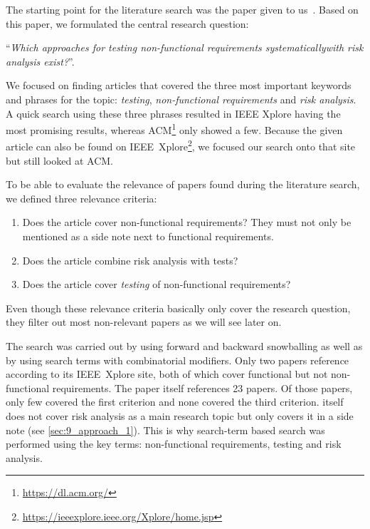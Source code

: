 The starting point for the literature search was the paper given to us~\cite{ZouPavlovski2008}.
Based on this paper, we formulated the central research question: 

\hspace*{0.5cm}\enquote{\textit{Which approaches for testing non-functional requirements systematically\newline \hspace*{0.7cm}with risk analysis exist?}}.

We focused on finding articles that covered the three most important keywords and phrases for the topic: \textit{testing}, \textit{non-functional requirements} and \textit{risk analysis}.
A quick search using these three phrases resulted in IEEE Xplore having the most promising results, whereas ACM\footnote{\url{https://dl.acm.org/}} only showed a few.
Because the given article \cite{ZouPavlovski2008} can also be found on IEEE~Xplore\footnote{\url{https://ieeexplore.ieee.org/Xplore/home.jsp}}, we focused our search onto that site but still looked at ACM.

To be able to evaluate the relevance of papers found during the literature search, we defined three relevance criteria:

\begin{enumerate}
	\item Does the article cover non-functional requirements? They must not only  be mentioned as a side note next to functional requirements.
	\item Does the article combine risk analysis with tests?
	\item Does the article cover \textit{testing} of non-functional requirements?
\end{enumerate}

Even though these relevance criteria basically only cover the research question, they filter out most non-relevant papers as we will see later on.

The search was carried out by using forward and backward snowballing as well as by using search terms with combinatorial modifiers.
Only two papers reference \cite{ZouPavlovski2008} according to its IEEE~Xplore site, both of which cover functional but not non-functional requirements.
The paper itself references 23 papers.
Of those papers, only few covered the first criterion and none covered the third criterion.
\cite{ZouPavlovski2008} itself does not cover risk analysis as a main research topic but only covers it in a side note (see \autoref{sec:9_approach_1}).
This is why search-term based search was performed using the key terms: non-functional requirements, testing and risk analysis.

